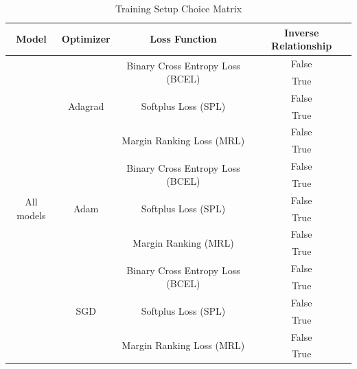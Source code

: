 \begin{table}
  \centering
  \caption{Training Setup Choice Matrix}
  \label{tab:training_setup_choice_matrix}
  \begin{tabular}{|c|c|c|c|}
    \hline
    \textbf{Model} & \textbf{Optimizer} & \textbf{Loss Function} & \textbf{Inverse Relationship} \bigstrut \\ \hline
    \multirow{18}{*}{All models} & \multirow{6}{*}{Adagrad} & \multirow{2}{*}{Binary Cross Entropy Loss (BCEL)} & False \\ \cline{4-4}
     &  &  & True \\ \cline{3-4}
     &  & \multirow{2}{*}{Softplus Loss (SPL)} & False \\ \cline{4-4}
     &  &  & True \\ \cline{3-4}
     &  & \multirow{2}{*}{Margin Ranking Loss (MRL)} & False \\ \cline{4-4}
     &  &  & True \\ \cline{2-4}
     & \multirow{6}{*}{Adam} & \multirow{2}{*}{Binary Cross Entropy Loss (BCEL) } & False \\ \cline{4-4}
     &  &  & True \\ \cline{3-4}
     &  & \multirow{2}{*}{Softplus Loss (SPL)} & False \\ \cline{4-4}
     &  &  & True \\ \cline{3-4}
     &  & \multirow{2}{*}{Margin Ranking (MRL)} & False \\ \cline{4-4}
     &  &  & True \\ \cline{2-4}
     & \multirow{6}{*}{SGD} & \multirow{2}{*}{Binary Cross Entropy Loss (BCEL)} & False \\ \cline{4-4}
     &  &  & True \\ \cline{3-4}
     &  & \multirow{2}{*}{Softplus Loss (SPL)} & False \\ \cline{4-4}
     &  &  & True \\ \cline{3-4}
     &  & \multirow{2}{*}{Margin Ranking Loss (MRL)} & False \\ \cline{4-4}
     &  &  & True \\ \hline
  \end{tabular}
\end{table}

